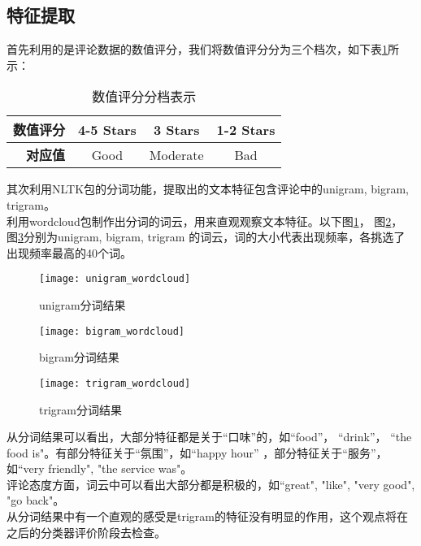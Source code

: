 \documentclass[a4paper, twocolumn]{article}
\begin{document}
\begin{CJK}{UTF8}{gbsn}
	\subsection{特征提取}
	首先利用的是评论数据的数值评分，我们将数值评分分为三个档次，如下表\ref{tb:stars}所示：
	\begin{table}[h]
		\caption{数值评分分档表示}
		\label{tb:stars}
		\centering
		\begin{tabular}{| r | c | c | c |}
			\hline
			\textbf{数值评分} & 4-5 Stars & 3 Stars & 1-2 Stars\\ 
			\hline
			\textbf{对应值} & Good & Moderate & Bad \\ 
			\hline
		\end{tabular}
	\end{table}
	\newline
	其次利用NLTK包的分词功能，提取出的文本特征\cite{text}包含评论中的unigram, bigram, trigram。\\
	利用wordcloud包制作出分词的词云，用来直观观察文本特征。以下图\ref{fig:unigram_wordcloud}， 图\ref{fig:bigram_wordcloud}， 图\ref{fig:trigram_wordcloud}分别为unigram, bigram, trigram 的词云，词的大小代表出现频率，各挑选了出现频率最高的40个词。
	\begin{figure}[h]
	\centering
	\texttt{[image: unigram\_wordcloud]}
	\caption{unigram分词结果}
	\label{fig:unigram_wordcloud}
	\end{figure}
	\begin{figure}[h]
	\centering
	\texttt{[image: bigram\_wordcloud]}
	\caption{bigram分词结果}
	\label{fig:bigram_wordcloud}
	\end{figure}
	\begin{figure}[h]
	\centering
	\texttt{[image: trigram\_wordcloud]}
	\caption{trigram分词结果}
	\label{fig:trigram_wordcloud}
	\end{figure}
	\newline
	从分词结果可以看出，大部分特征都是关于“口味”的，如“food”， “drink”， “the food is"。有部分特征关于“氛围”，如“happy hour” ，部分特征关于“服务”，如“very friendly", "the service was"。\\
	评论态度方面，词云中可以看出大部分都是积极的，如“great", "like", "very good", "go back"。\\
	从分词结果中有一个直观的感受是trigram的特征没有明显的作用，这个观点将在之后的分类器评价阶段去检查。

\end{CJK}
\end{document}
